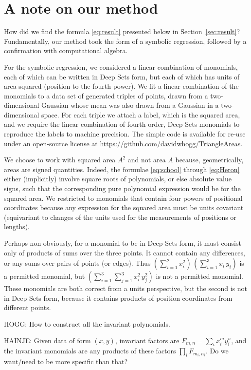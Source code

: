 \documentclass[12pt]{article}
\newcommand{\sectionname}{Section}
\newcommand{\secref}[1]{\sectionname~\ref{#1}}
\begin{document}
\section{A note on our method}\label{sec:method}
How did we find the formula \eqref{eq:result} presented below in \secref{sec:result}?
Fundamentally, our method took the form of a symbolic regression, followed by a confirmation with computational algebra.

For the symbolic regression, we considered a linear combination of monomials, each of which can be written in Deep Sets form, but each of which has units of area-squared (position to the fourth power).
We fit a linear combination of the monomials to a data set of generated triples of points, drawn from a two-dimensional Gaussian whose mean was also drawn from a Gaussian in a two-dimensional space.
For each triple we attach a label, which is the squared area, and we require the linear combination of fourth-order, Deep Sets monomials to reproduce the labels to machine precision.
The simple code is available for re-use under an open-source license at \url{https://github.com/davidwhogg/TriangleAreas}.

We choose to work with squared area $A^2$ and not area $A$ because, geometrically, areas are signed quantities.
Indeed, the formulae \eqref{eq:school} through \eqref{eq:Heron} either (implicitly) involve square roots of polynomials, or else absolute value signs, such that the corresponding pure polynomial expression would be for the squared area.
We restricted to monomials that contain four powers of positional coordinates because any expression for the squared area must be units covariant (equivariant to changes of the units used for the measurements of positions or lengths).

Perhaps non-obviously, for a monomial to be in Deep Sets form, it must consist only of products of sums over the three points.
It cannot contain any differences, or any sums over pairs of points (or edges).
Thus $(\sum_{i=1}^2 x_i^2)\,(\sum_{i=1}^3 x_i\,y_i)$ is a permitted monomial, but $(\sum_{i=1}^3\sum_{j=1}^3 x_i^2\,y_j^2)$ is not a permitted monomial.
These monomials are both correct from a units perspective, but the second is not in Deep Sets form, because it contains products of position coordinates from different points.

HOGG: How to construct all the invariant polynomials.

HAINJE: Given data of form $(x, y)$, invariant factors are $F_{m,n} = \sum_i x_i^m y_i^n$, and the invariant monomials are any products of these factors $\prod_{i} F_{m_i,n_i}$. Do we want/need to be more specific than that?
\end{document}
